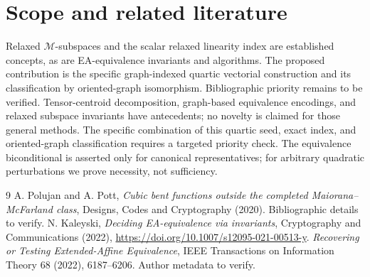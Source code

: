 \documentclass[11pt]{article}
\begin{document}
\section{Scope and related literature}
Relaxed $\mathcal M$-subspaces and the scalar relaxed linearity index are established concepts, as are EA-equivalence invariants and algorithms. The proposed contribution is the specific graph-indexed quartic vectorial construction and its classification by oriented-graph isomorphism. Bibliographic priority remains to be verified. Tensor-centroid decomposition, graph-based equivalence encodings, and relaxed subspace invariants have antecedents; no novelty is claimed for those general methods. The specific combination of this quartic seed, exact index, and oriented-graph classification requires a targeted priority check. The equivalence biconditional is asserted only for canonical representatives; for arbitrary quadratic perturbations we prove necessity, not sufficiency.
\begin{thebibliography}{9}
 A. Polujan and A. Pott, \emph{Cubic bent functions outside the completed Maiorana--McFarland class}, Designs, Codes and Cryptography (2020). Bibliographic details to verify.
 N. Kaleyski, \emph{Deciding EA-equivalence via invariants}, Cryptography and Communications (2022), \url{https://doi.org/10.1007/s12095-021-00513-y}.
 \emph{Recovering or Testing Extended-Affine Equivalence}, IEEE Transactions on Information Theory 68 (2022), 6187--6206. Author metadata to verify.
\end{thebibliography}
\end{document}
